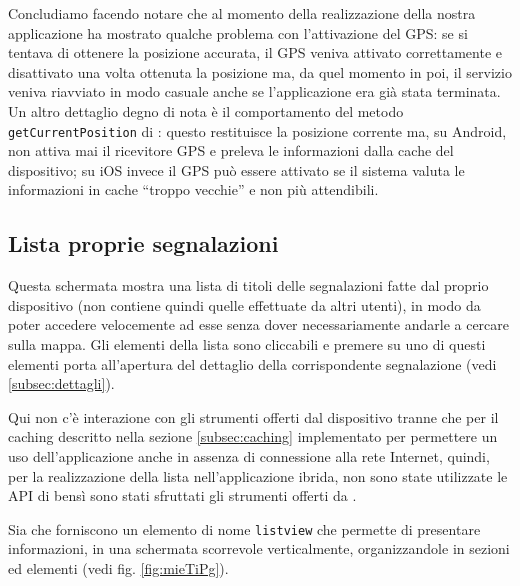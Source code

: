             Concludiamo facendo notare che al momento della realizzazione della
            nostra applicazione \pg{} ha mostrato qualche problema con
            l'attivazione del GPS: se si tentava di ottenere la posizione
            accurata, il GPS veniva attivato correttamente e disattivato una
            volta ottenuta la posizione ma, da quel momento in poi, il servizio
            veniva riavviato in modo casuale anche se l'applicazione era già
            stata terminata. Un altro dettaglio degno di nota è il comportamento
            del metodo \texttt{getCurrentPosition} di \tisdk{}: questo
            restituisce la posizione corrente ma, su Android, non attiva mai il
            ricevitore GPS e preleva le informazioni dalla cache del
            dispositivo; su iOS invece il GPS può essere attivato se il sistema
            valuta le informazioni in cache ``troppo vecchie'' e non più
            attendibili.

        \subsection{Lista proprie segnalazioni}
        \label{subsec:proprie}
            Questa schermata mostra una lista di titoli delle segnalazioni fatte
            dal proprio dispositivo (non contiene quindi quelle effettuate da altri
            utenti), in modo da poter accedere velocemente ad esse
            senza dover necessariamente andarle a cercare sulla mappa.
            Gli elementi della lista sono cliccabili e premere su uno di questi
            elementi porta all'apertura del dettaglio della corrispondente
            segnalazione (vedi \ref{subsec:dettagli}).

            Qui non c'è interazione con gli strumenti offerti dal dispositivo
            tranne che per il caching descritto nella sezione \ref{subsec:caching}
            implementato per permettere un uso dell'applicazione
            anche in assenza di connessione alla rete Internet,
            quindi, per la realizzazione della lista nell'applicazione ibrida, non sono
            state utilizzate le API di \pg{} bensì sono stati sfruttati gli
            strumenti offerti da \kendomob{}.

            Sia \kendomob{} che \tisdk{} forniscono un elemento di nome \texttt{listview}
            che permette di presentare informazioni, in una schermata scorrevole
            verticalmente, organizzandole in sezioni ed elementi (vedi fig. \ref{fig:mieTiPg}).

